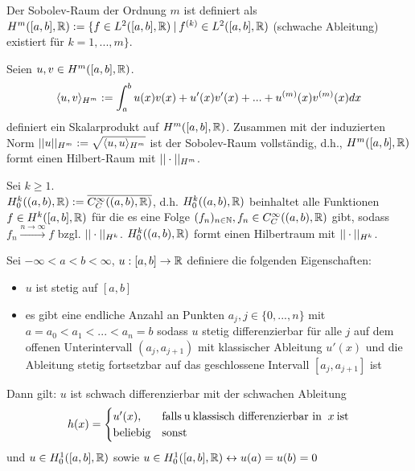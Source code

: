 \begin{definition}
	Der Sobolev-Raum der Ordnung $m$ ist definiert als $H^m([a,b],\mathbb{R}) := \{ f \in L^2([a,b],\mathbb{R}) \medspace | \medspace f^{(k)} \in L^2([a,b],\mathbb{R}) $ (schwache Ableitung) existiert für $ k=1,...,m \} $.
\end{definition} 

\begin{satz}
	Seien $u,v \in H^m([a,b],\mathbb{R})$.
	\begin{align*}
		\langle u, v \rangle_{H^m} := \int_{a}^{b} u(x)v(x) + u'(x)v'(x) + ... + u^{(m)}(x)v^{(m)}(x) dx
	\end{align*} definiert ein Skalarprodukt auf $H^m([a,b],\mathbb{R})$. Zusammen mit der induzierten Norm $||u||_{H^m} := \sqrt{\langle u, u \rangle_{H^m}}$ ist der Sobolev-Raum vollständig, d.h., $H^m([a,b],\mathbb{R})$ formt einen Hilbert-Raum mit $|| \cdot ||_{H^m}$.
\end{satz}

\begin{definition}
	Sei $k \geq 1$. \\ $H^k_0((a,b),\mathbb{R}) := \overline{C_C^\infty((a,b),\mathbb{R})}$, d.h. $H^k_0((a,b),\mathbb{R})$ beinhaltet alle Funktionen $f \in H^k([a,b],\mathbb{R})$ für die es eine Folge $(f_{n})_{n \in \mathbb{N}}, f_n \in C_C^\infty((a,b),\mathbb{R})$ gibt, sodass $f_n \overset{n \rightarrow \infty}{\rightarrow} f$ bzgl. $|| \cdot ||_{H^k}$. $H^k_0((a,b),\mathbb{R})$ formt einen Hilbertraum mit $|| \cdot ||_{H^k}$.
\end{definition}

\begin{satz}
	Sei $-\infty < a < b < \infty$, $u : [a,b] \rightarrow \mathbb{R}$ definiere die folgenden Eigenschaften:
	\begin{itemize}[noitemsep]
		\item $u$ ist stetig auf $[a,b]$
		\item es gibt eine endliche Anzahl an Punkten $a_j, j \in \{0,...,n\}$ mit $a = a_0 < a_1 < ... < a_n = b$ sodass $u$ stetig differenzierbar für alle $j$ auf dem offenen Unterintervall $(a_j,a_{j+1})$ mit klassischer Ableitung $u'(x)$  und die Ableitung stetig fortsetzbar auf das geschlossene Intervall $[a_j, a_{j+1}]$ ist
	\end{itemize} Dann gilt: $u$ ist schwach differenzierbar mit der schwachen Ableitung
	\begin{align*}
		h(x) = \begin{cases}
		 u'(x), & \text{falls} \medspace $u$ \medspace \text{klassisch differenzierbar in } \medspace x \medspace \text{ist} \\
		 \text{beliebig} & \text{sonst}
		\end{cases}
	\end{align*}
	und $u \in H^1_0([a,b],\mathbb{R})$ sowie  $u \in H^1_0([a,b],\mathbb{R}) \leftrightarrow u(a) = u(b) = 0$
\end{satz}

